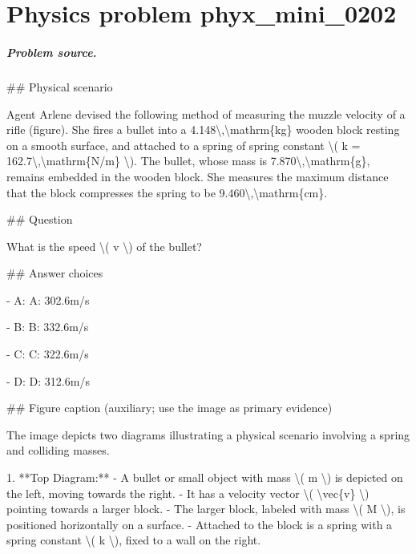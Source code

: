 
\chapter{Physics problem phyx\_mini\_0202}
\label{ch:PhyXMiniProblems_problem_phyx_mini_0202}

\paragraph{Problem source.}
\#\# Physical scenario

Agent Arlene devised the following method of measuring the muzzle velocity of a rifle (figure). She fires a bullet into a 4.148\textbackslash{},\textbackslash{}mathrm\{kg\} wooden block resting on a smooth surface, and attached to a spring of spring constant \textbackslash{}( k = 162.7\textbackslash{},\textbackslash{}mathrm\{N/m\} \textbackslash{}). The bullet, whose mass is 7.870\textbackslash{},\textbackslash{}mathrm\{g\}, remains embedded in the wooden block. She measures the maximum distance that the block compresses the spring to be 9.460\textbackslash{},\textbackslash{}mathrm\{cm\}.

\#\# Question

What is the speed \textbackslash{}( v \textbackslash{}) of the bullet?

\#\# Answer choices

- A: A: 302.6m/s

- B: B: 332.6m/s

- C: C: 322.6m/s

- D: D: 312.6m/s

\#\# Figure caption (auxiliary; use the image as primary evidence)

The image depicts two diagrams illustrating a physical scenario involving a spring and colliding masses.

1. **Top Diagram:**
   - A bullet or small object with mass \textbackslash{}( m \textbackslash{}) is depicted on the left, moving towards the right.
   - It has a velocity vector \textbackslash{}( \textbackslash{}vec\{v\} \textbackslash{}) pointing towards a larger block.
   - The larger block, labeled with mass \textbackslash{}( M \textbackslash{}), is positioned horizontally on a surface.
   - Attached to the block is a spring with a spring constant \textbackslash{}( k \textbackslash{}), fixed to a wall on the right.

